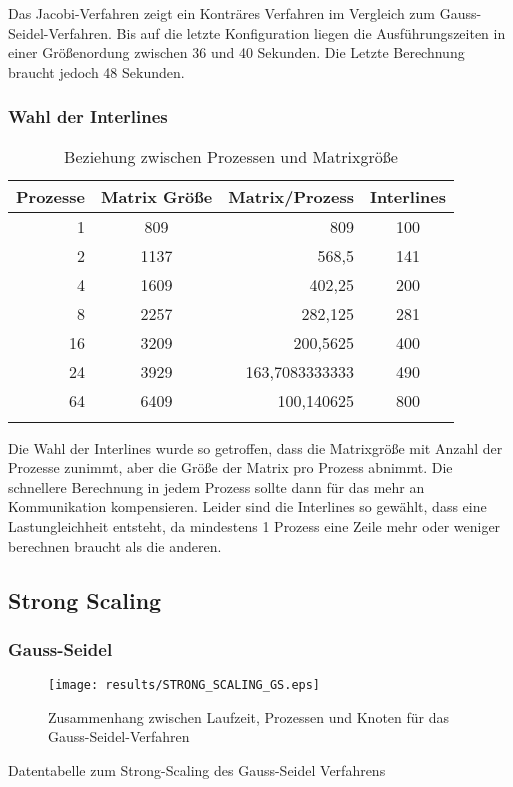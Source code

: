 \documentclass[a4paper,12pt]{scrartcl}
\begin{document}
Das Jacobi-Verfahren zeigt ein Konträres Verfahren im Vergleich zum Gauss-Seidel-Verfahren. 
Bis auf die letzte Konfiguration liegen die Ausführungszeiten in einer Größenordung zwischen 36 und 40 Sekunden.
Die Letzte Berechnung braucht jedoch 48 Sekunden.
\FloatBarrier
\subsubsection{Wahl der Interlines}
\begin{longtable}{r|c|r|c}
Prozesse&Matrix Größe&Matrix/Prozess&Interlines \\ \hline \endhead 

1	&809	&809	&100\\
2	&1137	&568,5	&141\\
4	&1609	&402,25	&200\\
8	&2257	&282,125	&281\\
16	&3209	&200,5625	&400\\
24	&3929	&163,7083333333	&490\\
64	&6409	&100,140625	&800\\
\caption{Beziehung zwischen Prozessen und Matrixgröße}
\end{longtable}
Die Wahl der Interlines wurde so getroffen, dass die Matrixgröße mit Anzahl der Prozesse zunimmt, aber die Größe der Matrix pro Prozess abnimmt. Die schnellere Berechnung in jedem Prozess sollte dann für das mehr an Kommunikation kompensieren.
Leider sind die Interlines so gewählt, dass eine Lastungleichheit entsteht, da mindestens 1 Prozess eine Zeile mehr oder weniger berechnen braucht als die anderen.
\newpage
\FloatBarrier
\subsection{Strong Scaling}
\subsubsection{Gauss-Seidel}
\begin{figure}[hr!]
\texttt{[image: results/STRONG\_SCALING\_GS.eps]}
 \caption{Zusammenhang zwischen Laufzeit, Prozessen und Knoten für das Gauss-Seidel-Verfahren}
\end{figure}
\begin{table}[hl!]

\caption{Datentabelle zum Strong-Scaling des Gauss-Seidel Verfahrens}
\end{table}
\end{document}
